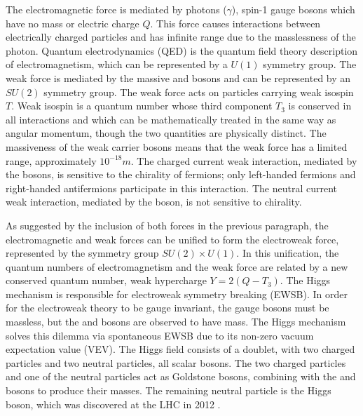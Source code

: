 The electromagnetic force is mediated by photons ($\gamma$), spin-1 gauge bosons which have no mass or electric charge $Q$. This force causes interactions between electrically charged particles and has infinite range due to the masslessness of the photon. Quantum electrodynamics (QED) is the quantum field theory description of electromagnetism, which can be represented by a $U(1)$ symmetry group. The weak force is mediated by the massive \Wpm and \Z bosons and can be represented by an $SU(2)$ symmetry group. The weak force acts on particles carrying weak isospin $T$. Weak isospin is a quantum number whose third component $T_3$ is conserved in all interactions and which can be mathematically treated in the same way as angular momentum, though the two quantities are physically distinct. The massiveness of the weak carrier bosons means that the weak force has a limited range, approximately $10^{-18}\unit{m}$. The charged current weak interaction, mediated by the \Wpm bosons, is sensitive to the chirality of fermions; only left-handed fermions and right-handed antifermions participate in this interaction. The neutral current weak interaction, mediated by the \Z boson, is not sensitive to chirality.

As suggested by the inclusion of both forces in the previous paragraph, the electromagnetic and weak forces can be unified to form the electroweak force, represented by the symmetry group $SU(2) \times U(1)$. In this unification, the quantum numbers of electromagnetism and the weak force are related by a new conserved quantum number, weak hypercharge $Y = 2(Q - T_3)$. The Higgs mechanism is responsible for electroweak symmetry breaking (EWSB). In order for the electroweak theory to be gauge invariant, the gauge bosons must be massless, but the \Wpm and \Z bosons are observed to have mass. The Higgs mechanism solves this dilemma via spontaneous EWSB due to its non-zero vacuum expectation value (VEV). The Higgs field consists of a doublet, with two charged particles and two neutral particles, all scalar bosons. The two charged particles and one of the neutral particles act as Goldstone bosons, combining with the \Wpm and \Z bosons to produce their masses. The remaining neutral particle is the Higgs boson, which was discovered at the LHC in 2012 \cite{NewBoson}.

